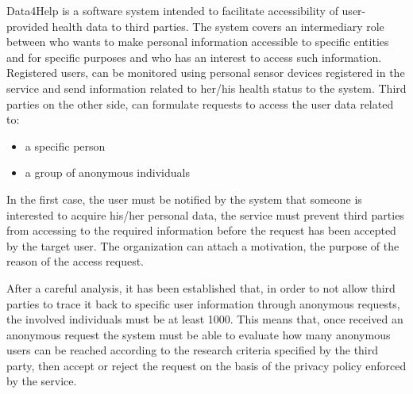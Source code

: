 \begin{flushleft}
Data4Help is a software system intended to facilitate accessibility of user-provided health data to third parties. The system covers an intermediary role between who wants to make  personal information accessible to specific entities and for specific purposes and who has an interest to access such information. Registered users, can be monitored using personal sensor devices registered in the service and send information related to her/his health status to the system. Third parties on the other side, can formulate requests to access the user data related to:

\begin{itemize}[partopsep=1cm]
	\item a specific person
	\item a group of anonymous individuals
\end{itemize}

In the first case, the user must be notified by the system that someone is interested to acquire his/her personal data, the service must prevent third parties from accessing to the required information before the request has been accepted by the target user. The organization can attach a motivation, the purpose of the reason of the access request.

After a careful analysis, it has been established that, in order to not allow third parties to trace it back to specific user information through anonymous requests, the involved individuals must be at least 1000. This means that, once received an anonymous request the system must be able to evaluate how many anonymous users can be reached according to the research criteria specified by the third party, then accept or reject the request on the basis of the privacy policy enforced by the service. 
{}


\end{flushleft}
